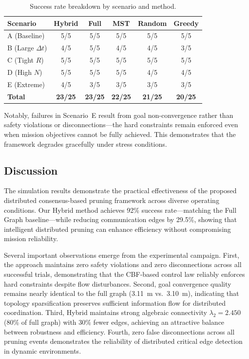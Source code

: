 \documentclass[conference]{IEEEconf}
\theoremstyle{plain}
\begin{document}
\begin{table}[t]
\centering
\caption{Success rate breakdown by scenario and method.}
\label{tab:scenarios-results}
\begin{tabular}{lccccc}
\hline
\textbf{Scenario} & \textbf{Hybrid} & \textbf{Full} & \textbf{MST} & \textbf{Random} & \textbf{Greedy} \\
\hline
A (Baseline) & 5/5 & 5/5 & 5/5 & 5/5 & 5/5 \\
B (Large $\Delta t$) & 4/5 & 5/5 & 4/5 & 4/5 & 3/5 \\
C (Tight $R$) & 5/5 & 5/5 & 5/5 & 5/5 & 5/5 \\
D (High $N$) & 5/5 & 5/5 & 5/5 & 4/5 & 4/5 \\
E (Extreme) & 4/5 & 3/5 & 3/5 & 3/5 & 3/5 \\
\hline
\textbf{Total} & \textbf{23/25} & \textbf{23/25} & \textbf{22/25} & \textbf{21/25} & \textbf{20/25} \\
\hline
\end{tabular}
\end{table}

Notably, failures in Scenario~E result from goal non-convergence rather than safety violations or disconnections---the hard constraints remain enforced even when mission objectives cannot be fully achieved. This demonstrates that the framework degrades gracefully under stress conditions.

\subsection{Discussion}

The simulation results demonstrate the practical effectiveness of the proposed distributed consensus-based pruning framework across diverse operating conditions. Our Hybrid method achieves 92\% success rate---matching the Full Graph baseline---while reducing communication edges by 29.5\%, showing that intelligent distributed pruning can enhance efficiency without compromising mission reliability.

Several important observations emerge from the experimental campaign. First, the approach maintains zero safety violations and zero disconnections across all successful trials, demonstrating that the CBF-based control law reliably enforces hard constraints despite flow disturbances. Second, goal convergence quality remains nearly identical to the full graph (3.11~m vs.\ 3.10~m), indicating that topology sparsification preserves sufficient information flow for distributed coordination. Third, Hybrid maintains strong algebraic connectivity $\lambda_2 = 2.450$ (80\% of full graph) with 30\% fewer edges, achieving an attractive balance between robustness and efficiency. Fourth, zero false disconnections across all pruning events demonstrates the reliability of distributed critical edge detection in dynamic environments.
\end{document}

